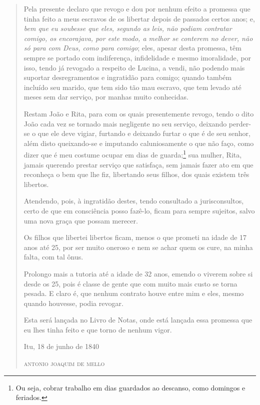 \begin{quote}
Pela presente declaro que revogo e dou por nenhum efeito a promessa que
tinha feito a meus escravos de os libertar depois de passados certos
anos; e, \emph{bem que eu soubesse que eles, segundo as leis, não podiam
contratar comigo, os encorajava, por este modo, a melhor se conterem no
dever, não só para com Deus, como para comigo}; eles, apesar desta
promessa, têm sempre se portado com indiferença, infidelidade e mesmo
imoralidade, por isso, tendo já revogado a respeito de Lucina, a vendi,
não podendo mais suportar desregramentos e ingratidão para comigo;
quando também incluído seu marido, que tem sido tão mau escravo, que tem
levado até meses sem dar serviço, por manhas muito conhecidas.

Restam João e Rita, para com os quais presentemente revogo, tendo o dito
João cada vez se tornado mais negligente no seu serviço, deixando
perder-se o que ele deve vigiar, furtando e deixando furtar o que é de
seu senhor, além disto queixando-se e imputando caluniosamente o que não
faço, como dizer que é meu costume ocupar em dias de guarda;\footnote{
  Ou seja, cobrar trabalho em dias guardados ao descanso, como domingos
  e feriados.} sua mulher, Rita, jamais querendo prestar serviço que
satisfaça, sem jamais fazer ato em que reconheça o bem que lhe fiz,
libertando seus filhos, dos quais existem três libertos.

Atendendo, pois, à ingratidão destes, tendo consultado a jurisconsultos,
certo de que em consciência posso fazê-lo, ficam para sempre sujeitos,
salvo uma nova graça que possam merecer.

Os filhos que libertei libertos ficam, menos o que prometi na idade de
17 anos até 25, por ser muito oneroso e nem se achar quem os cure, na
minha falta, com tal ônus.

Prolongo mais a tutoria até a idade de 32 anos, emendo o viverem sobre
si desde os 25, pois é classe de gente que com muito mais custo se torna
pesada. E claro é, que nenhum contrato houve entre mim e eles, mesmo
quando houvesse, podia revogar.

Esta será lançada no Livro de Notas, onde está lançada essa promessa que
eu lhes tinha feito e que torno de nenhum vigor.

\begin{flushright}
Itu, 18 de junho de 1840

\textsc{antonio joaquim de mello}
\end{flushright}
\end{quote}

